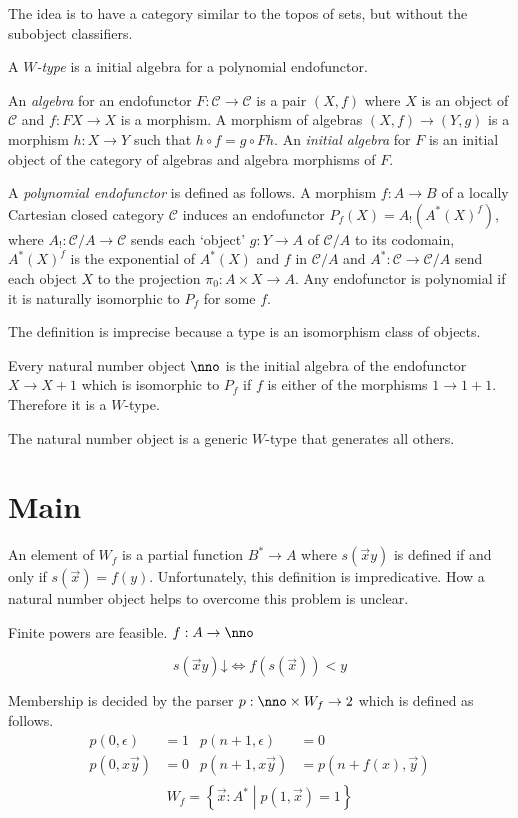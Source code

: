 \documentclass{tac}
\newcommand\cat\mathcal
\newcommand\set[1]{\left\{#1\right\}}
\newcommand\ri{^*}
\newcommand\of:
\begin{document}
The idea is to have a category similar to the topos of sets, but without the subobject classifiers.

\begin{definition} A \emph{$W$-type} is a initial algebra for a polynomial endofunctor. 

An \emph{algebra} for an endofunctor $F\of \cat C\to\cat C$ is a pair $(X,f)$ where $X$ is an object of $\cat C$ and $f\of FX\to X$ is a morphism. A morphism of algebras $(X,f)\to(Y,g)$ is a morphism $h\of X\to Y$ such that $h\circ f=g\circ Fh$. An \emph{initial algebra} for $F$ is an initial object of the category of algebras and algebra morphisms of $F$.

A \emph{polynomial endofunctor} is defined as follows. A morphism $f\of A\to B$ of a locally Cartesian closed category $\cat C$ induces an endofunctor $P_f(X) = A_!(A\ri(X)^f)$, where $A_!\of \cat C/A\to \cat C$ sends each `object' $g\of Y\to A$ of $\cat C/A$ to its codomain, $A\ri(X)^f$ is the exponential of $A\ri(X)$ and $f$ in $\cat C/A$ and $A\ri\of \cat C\to\cat C/A$ send each object $X$ to the projection $\pi_0\of A\times X\to A$. Any endofunctor is polynomial if it is naturally isomorphic to $P_f$ for some $f$.
\end{definition}

The definition is imprecise because a type is an isomorphism class of objects.

\begin{example} Every natural number object $\nno$ is the initial algebra of the endofunctor $X\to X+1$ which is isomorphic to $P_f$ if $f$ is either of the morphisms $1\to 1+1$. Therefore it is a $W$-type.
\end{example}

The natural number object is a generic $W$-type that generates all others.

\section{Main}%

An element of $W_f$ is a partial function $B^*\to A$ where $s(\vec x y)$ is defined if and only if $s(\vec x)=f(y)$. Unfortunately, this definition is impredicative. How a natural number object helps to overcome this problem is unclear.

Finite powers are feasible.
$f\of A\to \nno$

\[ s(\vec xy)\mathord\downarrow \iff f(s(\vec x))<y \]

Membership is decided by the parser $p\of \nno\times W_f \to 2$ which is defined as follows. 
\begin{align*}
p(0,\epsilon) &= 1 & p(n+1,\epsilon) &= 0\\
p(0,x\vec y) &= 0 & p(n+1,x\vec y) &= p(n+f(x),\vec y)\\
\end{align*}
\[ W_f=\set{\vec x\of A^*\middle| p(1,\vec x)=1} \]
\end{document}
